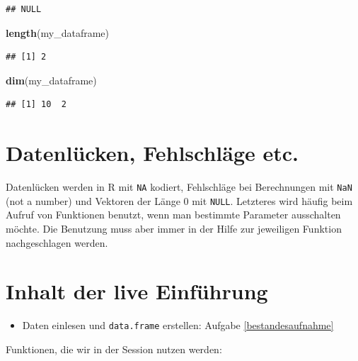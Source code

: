 \documentclass[]{book}
\newenvironment{Shaded}{\begin{snugshade}}{\end{snugshade}}
\newcommand{\KeywordTok}[1]{\textcolor[rgb]{0.13,0.29,0.53}{\textbf{#1}}}
\newcommand{\NormalTok}[1]{#1}
\providecommand{\tightlist}{%
  \setlength{\itemsep}{0pt}\setlength{\parskip}{0pt}}
\begin{document}
\begin{verbatim}
## NULL
\end{verbatim}

\begin{Shaded}
\begin{Highlighting}[]
\KeywordTok{length}\NormalTok{(my_dataframe)}
\end{Highlighting}
\end{Shaded}

\begin{verbatim}
## [1] 2
\end{verbatim}

\begin{Shaded}
\begin{Highlighting}[]
\KeywordTok{dim}\NormalTok{(my_dataframe)}
\end{Highlighting}
\end{Shaded}

\begin{verbatim}
## [1] 10  2
\end{verbatim}

\hypertarget{datenluxfccken-fehlschluxe4ge-etc.}{%
\section{Datenlücken, Fehlschläge etc.}\label{datenluxfccken-fehlschluxe4ge-etc.}}

Datenlücken werden in R mit \texttt{NA} kodiert, Fehlschläge bei Berechnungen mit \texttt{NaN} (not a number) und Vektoren der Länge 0 mit \texttt{NULL}. Letzteres wird häufig beim Aufruf von Funktionen benutzt, wenn man bestimmte Parameter ausschalten möchte. Die Benutzung muss aber immer in der Hilfe zur jeweiligen Funktion nachgeschlagen werden.

\hypertarget{inhalt-der-live-einfuxfchrung-1}{%
\section{Inhalt der live Einführung}\label{inhalt-der-live-einfuxfchrung-1}}

\begin{itemize}
\tightlist
\item
  Daten einlesen und \texttt{data.frame} erstellen: Aufgabe \ref{bestandesaufnahme}
\end{itemize}

Funktionen, die wir in der Session nutzen werden:
\end{document}
